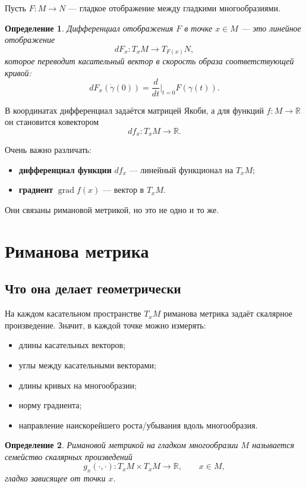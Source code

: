\documentclass[12pt,a4paper]{article}
\theoremstyle{rudef}
\newtheorem{definition}{Определение}[section]
\theoremstyle{ruplain}
\newcommand{\R}{\mathbb{R}}
\newcommand{\grad}{\operatorname{grad}}
\begin{document}
Пусть $F:M\to N$ --- гладкое отображение между гладкими многообразиями.

\begin{definition}
\emph{Дифференциал} отображения $F$ в точке $x\in M$ --- это линейное отображение
\[
dF_x:T_xM\to T_{F(x)}N,
\]
которое переводит касательный вектор в скорость образа соответствующей кривой:
\[
dF_x(\dot \gamma(0)) = \frac{d}{dt}\Big|_{t=0} F(\gamma(t)).
\]
\end{definition}

В координатах дифференциал задаётся матрицей Якоби, а для функций $f:M\to \R$ он становится ковектором
\[
df_x:T_xM\to \R.
\]

\begin{warningbox}
Очень важно различать:
\begin{itemize}
  \item \textbf{дифференциал функции} $df_x$ --- линейный функционал на $T_xM$;
  \item \textbf{градиент} $\grad f(x)$ --- вектор в $T_xM$.
\end{itemize}
Они связаны римановой метрикой, но это не одно и то же.
\end{warningbox}

\section{Риманова метрика}

\subsection{Что она делает геометрически}

На каждом касательном пространстве $T_xM$ риманова метрика задаёт скалярное произведение. Значит, в каждой точке можно измерять:
\begin{itemize}
  \item длины касательных векторов;
  \item углы между касательными векторами;
  \item длины кривых на многообразии;
  \item норму градиента;
  \item направление наискорейшего роста/убывания вдоль многообразия.
\end{itemize}

\begin{definition}
Римановой метрикой на гладком многообразии $M$ называется семейство скалярных произведений
\[
g_x(\cdot,\cdot):T_xM\times T_xM\to \R,
\qquad x\in M,
\]
гладко зависящее от точки $x$.
\end{definition}
\end{document}

